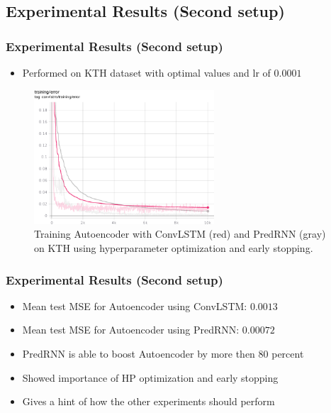  \subsection{Experimental Results (Second setup)}
  \begin{frame}
   \frametitle{Experimental Results (Second setup)}
   
   \begin{itemize}
    \item<1-> Performed on KTH dataset with optimal values and lr of $0.0001$
   \end{itemize}
   
   \begin{figure}[H]
   \includegraphics[width=0.6\textwidth]{../Images/exp2_training_error.png}
   \centering
   \caption{Training Autoencoder with ConvLSTM (red) and PredRNN (gray) on KTH using hyperparameter optimization and early stopping.}
   \label{fig:autoenc_exp2_training}
  \end{figure}   
   
  \end{frame}
  \begin{frame}
   \frametitle{Experimental Results (Second setup)}
   
   \begin{itemize}
    \item<1-> Mean test MSE for Autoencoder using ConvLSTM: \textbf{$0.0013$}
    \item<2-> Mean test MSE for Autoencoder using PredRNN: \textbf{$0.00072$}
    \item<3-> PredRNN is able to boost Autoencoder by more then $80$ percent
    \item<4-> Showed importance of HP optimization and early stopping
    \item<5-> Gives a hint of how the other experiments should perform
   \end{itemize}
  \end{frame}
